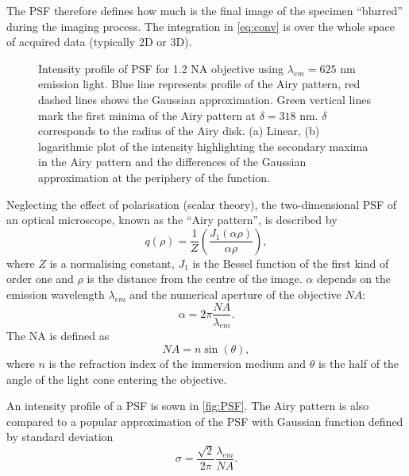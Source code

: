 The PSF therefore defines how much is the final image of the specimen ``blurred'' during the imaging process. The integration in \autoref{eq:conv} is over the whole space of acquired data (typically 2D or 3D). 

\begin{figure}[!bht]
	\centering
	\newcommand{\wf}{.48\textwidth}
	\caption{Intensity profile of PSF for 1.2 NA objective using $\lambda_{em}=625$ nm emission light. Blue line represents profile of the Airy pattern, red dashed lines shows the Gaussian approximation. Green vertical lines mark the first minima of the Airy pattern at $\delta=318$ nm. $\delta$ corresponds to the radius of the Airy disk. (a) Linear, (b) logarithmic plot of the intensity highlighting the secondary maxima in the Airy pattern and the differences of the Gaussian approximation at the periphery of the function.}
	\label{fig:PSF}
\end{figure}
%
Neglecting the effect of polarisation (scalar theory), the two-dimensional PSF of an optical microscope, known as the ``Airy pattern'', is described by
%
\begin{equation}
	q(\rho)=\frac{1}{Z}\left(\frac{J_1(\alpha \rho)}{\alpha \rho}\right),
\end{equation}
%
where $Z$ is a normalising constant, $J_1$ is the Bessel function of the first kind of order one and $\rho$ is the distance from the centre of the image. $\alpha$ depends on the emission wavelength $\lambda_{em}$ and the numerical aperture of the objective $\unit{NA}$:
%
\begin{equation}
	\alpha=2\pi\frac{\unit{NA}}{\lambda_{em}}.
\end{equation}
% 
The NA is defined as
\begin{equation}
	\unit{NA}=n\sin(\theta),
\end{equation}
%
where $n$ is the refraction index of the immersion medium and $\theta$ is the half of the angle of the light cone entering the objective.

An intensity profile of a PSF is sown in \autoref{fig:PSF}. The Airy pattern is also compared to a popular approximation of the PSF with Gaussian function \cite{Zhang2007} defined by standard deviation
%
\begin{equation}
	\sigma=\frac{\sqrt{2}}{2\pi}\frac{\lambda_{em}}{\unit{NA}}.
\end{equation}

